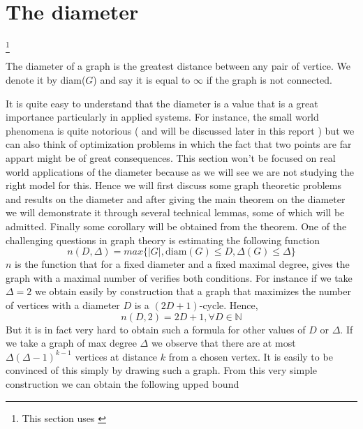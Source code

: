 \section{The diameter}\footnote{This section uses \cite{Bollob01}}

\begin{definition}
	The diameter of a graph is the greatest distance between any pair of vertice. We denote it by diam($G$) and say it is equal to $\infty$ if the graph is not connected.
\end{definition}
It is quite easy to understand that the diameter is a value that is a great importance particularly in applied systems. For instance, the small world phenomena is quite notorious ( and will be discussed later in this report ) but we can also think of optimization problems in which the fact that two points are far appart might be of great consequences.
This section won't be focused on real world applications of the diameter because as we will see we are not studying the right model for this. 
Hence we will first discuss some graph theoretic problems and results on the diameter and after giving the main theorem on the diameter we will demonstrate it through several technical lemmas, some of which will be admitted. Finally some corollary will be obtained from the theorem.
\newline
One of the challenging questions in graph theory is estimating the following function
\begin{equation}
	n(D, \Delta) = max\{ |G|, \text{diam}(G) \leq D, \Delta(G) \leq \Delta\}
\end{equation}
$n$ is the function that for a fixed diameter and a fixed maximal degree, gives the graph with a maximal number of verifies both conditions.
\newline
For instance if we take $\Delta = 2$ we obtain easily by construction that a graph that maximizes the number of vertices with a diameter $D$ is a $(2D+1)$-cycle. Hence, 
\begin{equation}
	n(D, 2) = 2D + 1, \forall D \in \mathbb{N}
\end{equation}
But it is in fact very hard to obtain such a formula for other values of $D$ or $\Delta$.
\newline
If we take a graph of max degree $\Delta$ we observe that there are at most $\Delta (\Delta - 1)^{k-1}$ vertices at distance $k$ from a chosen vertex. It is easily to be convinced of this simply by drawing such a graph. 
From this very simple construction we can obtain the following upped bound
